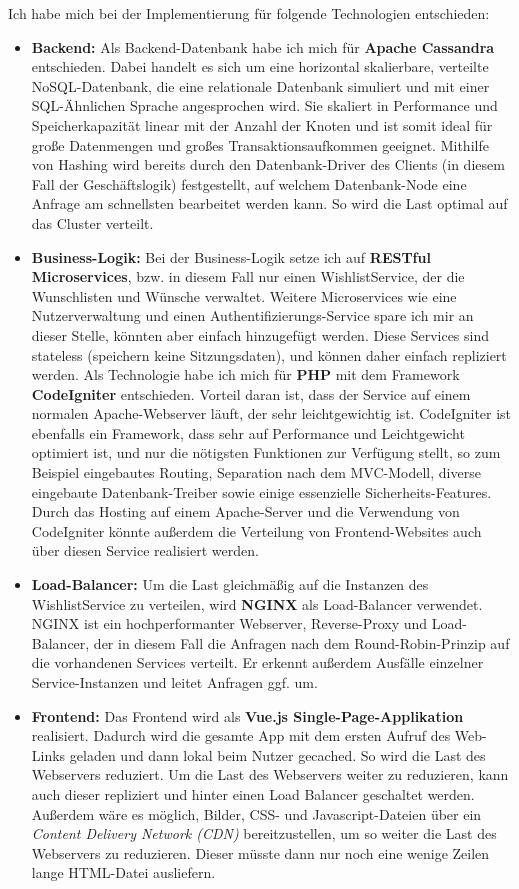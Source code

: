 \documentclass[12pt]{article}
\begin{document}
Ich habe mich bei der Implementierung für folgende Technologien entschieden:
\begin{itemize}
	\item \textbf{Backend:} Als Backend-Datenbank habe ich mich für \textbf{Apache Cassandra} entschieden. Dabei handelt es sich um eine horizontal skalierbare, verteilte NoSQL-Datenbank, die eine relationale Datenbank simuliert und mit einer SQL-Ähnlichen Sprache angesprochen wird.
	Sie skaliert in Performance und Speicherkapazität linear mit der Anzahl der Knoten und ist somit ideal für große Datenmengen und großes Transaktionsaufkommen geeignet.
	Mithilfe von Hashing wird bereits durch den Datenbank-Driver des Clients (in diesem Fall der Geschäftslogik) festgestellt, auf welchem Datenbank-Node eine Anfrage am schnellsten bearbeitet werden kann.
	So wird die Last optimal auf das Cluster verteilt.
	\item \textbf{Business-Logik:} Bei der Business-Logik setze ich auf \textbf{RESTful Microservices}, bzw. in diesem Fall nur einen WishlistService, der die Wunschlisten und Wünsche verwaltet.
	Weitere Microservices wie eine Nutzerverwaltung und einen Authentifizierungs-Service spare ich mir an dieser Stelle, könnten aber einfach hinzugefügt werden.
	Diese Services sind stateless (speichern keine Sitzungsdaten), und können daher einfach repliziert werden.
	Als Technologie habe ich mich für \textbf{PHP} mit dem Framework \textbf{CodeIgniter} entschieden.
	Vorteil daran ist, dass der Service auf einem normalen Apache-Webserver läuft, der sehr leichtgewichtig ist.
	CodeIgniter ist ebenfalls ein Framework, dass sehr auf Performance und Leichtgewicht optimiert ist, und nur die nötigsten Funktionen zur Verfügung stellt, so zum Beispiel eingebautes Routing, Separation nach dem MVC-Modell, diverse eingebaute Datenbank-Treiber sowie einige essenzielle Sicherheits-Features.
	Durch das Hosting auf einem Apache-Server und die Verwendung von CodeIgniter könnte außerdem die Verteilung von Frontend-Websites auch über diesen Service realisiert werden.
	\item \textbf{Load-Balancer:} Um die Last gleichmäßig auf die Instanzen des WishlistService zu verteilen, wird \textbf{NGINX} als Load-Balancer verwendet. NGINX ist ein hochperformanter Webserver, Reverse-Proxy und Load-Balancer, der in diesem Fall die Anfragen nach dem Round-Robin-Prinzip auf die vorhandenen Services verteilt. Er erkennt außerdem Ausfälle einzelner Service-Instanzen und leitet Anfragen ggf. um.
	\item \textbf{Frontend:} Das Frontend wird als \textbf{Vue.js Single-Page-Applikation} realisiert. Dadurch wird die gesamte App mit dem ersten Aufruf des Web-Links geladen und dann lokal beim Nutzer gecached.
	So wird die Last des Webservers reduziert.
	Um die Last des Webservers weiter zu reduzieren, kann auch dieser repliziert und hinter einen Load Balancer geschaltet werden.
	Außerdem wäre es möglich, Bilder, CSS- und Javascript-Dateien über ein \emph{Content Delivery Network (CDN)} bereitzustellen, um so weiter die Last des Webservers zu reduzieren. Dieser müsste dann nur noch eine wenige Zeilen lange HTML-Datei ausliefern. 
\end{itemize}
\end{document}
